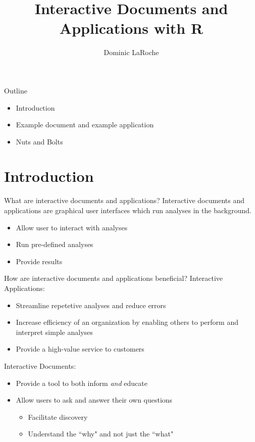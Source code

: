 \documentclass{beamer}\usepackage[]{graphicx}\usepackage[]{color}
\title[Interactive Documents and Applications]{Interactive Documents and Applications with R}
\author[Dominic LaRoche]{Dominic LaRoche}
\begin{document}
\maketitle

\begin{frame}{Outline}
\begin{itemize}
\item Introduction
\bigskip
\item Example document and example application 
\bigskip
\item Nuts and Bolts
\end{itemize}
\end{frame}

\section{Introduction}

\begin{frame}{What are interactive documents and applications?}
Interactive documents and applications are graphical user interfaces which run analyses in the background.
\bigskip
\begin{itemize}
\item Allow user to interact with analyses
\bigskip
\item Run pre-defined analyses
\bigskip
\item Provide results
\end{itemize}
\end{frame}

\begin{frame}{How are interactive documents and applications beneficial?}
Interactive Applications:
\begin{itemize}
\smallskip
\item Streamline repetetive analyses and reduce errors
\smallskip
\pause
\item Increase efficiency of an organization by enabling others to perform and interpret simple analyses
\smallskip
\pause
\item Provide a high-value service to customers
\end{itemize}
\bigskip
\pause

Interactive Documents:
\smallskip
\begin{itemize}
\item Provide a tool to both inform \emph{and} educate
\smallskip
\pause
\item Allow users to ask and answer their own questions
  \begin{itemize}
  \item Facilitate discovery
  \item Understand the ``why" and not just the ``what"
  \end{itemize}
\end{itemize}
\end{frame}
\end{document}
